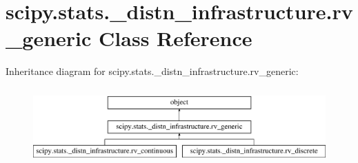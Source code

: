 \hypertarget{classscipy_1_1stats_1_1__distn__infrastructure_1_1rv__generic}{}\section{scipy.\+stats.\+\_\+distn\+\_\+infrastructure.\+rv\+\_\+generic Class Reference}
\label{classscipy_1_1stats_1_1__distn__infrastructure_1_1rv__generic}
Inheritance diagram for scipy.\+stats.\+\_\+distn\+\_\+infrastructure.\+rv\+\_\+generic\+:\begin{figure}[H]
\begin{center}
\leavevmode
\includegraphics[height=2.968198cm]{classscipy_1_1stats_1_1__distn__infrastructure_1_1rv__generic}
\end{center}
\end{figure}
